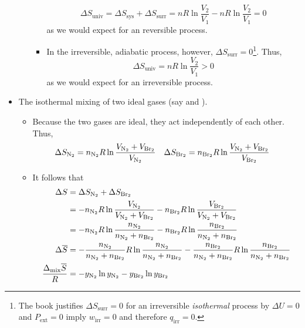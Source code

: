 \documentclass[../notes.tex]{subfiles}
\begin{document}
\begin{itemize}
\begin{itemize}
\begin{itemize}
\begin{equation*}
                \Delta S_\text{univ} = \Delta S_\text{sys}+\Delta S_\text{surr}
                = nR\ln\frac{V_2}{V_1}-nR\ln\frac{V_2}{V_1}
                = 0
            \end{equation*}
            as we would expect for an reversible process.
            \item In the irreversible, adiabatic process, however, $\Delta S_\text{surr}=0$\footnote{The book justifies $\Delta S_\text{surr}=0$ for an irreversible \emph{isothermal} process by $\Delta U=0$ and $P_\text{ext}=0$ imply $w_\text{irr}=0$ and therefore $q_\text{irr}=0$.}. Thus,
            \begin{equation*}
                \Delta S_\text{univ} = nR\ln\frac{V_2}{V_1}
                > 0
            \end{equation*}
            as we would expect for an irreversible process.
        \end{itemize}
    \end{itemize}
    \item The isothermal mixing of two ideal gases (say  and ).
    \begin{itemize}
        \item Because the two gases are ideal, they act independently of each other. Thus,
        \begin{align*}
            \Delta S_{\ce{N2}} &= n_{\ce{N2}}R\ln\frac{V_{\ce{N2}}+V_{\ce{Br2}}}{V_{\ce{N2}}}&
            \Delta S_{\ce{Br2}} &= n_{\ce{Br2}}R\ln\frac{V_{\ce{N2}}+V_{\ce{Br2}}}{V_{\ce{Br2}}}
        \end{align*}
        \item It follows that
        \begin{align*}
            \Delta S &= \Delta S_{\ce{N2}}+\Delta S_{\ce{Br2}}\\
            &= -n_{\ce{N2}}R\ln\frac{V_{\ce{N2}}}{V_{\ce{N2}}+V_{\ce{Br2}}}-n_{\ce{Br2}}R\ln\frac{V_{\ce{Br2}}}{V_{\ce{N2}}+V_{\ce{Br2}}}\\
            &= -n_{\ce{N2}}R\ln\frac{n_{\ce{N2}}}{n_{\ce{N2}}+n_{\ce{Br2}}}-n_{\ce{Br2}}R\ln\frac{n_{\ce{Br2}}}{n_{\ce{N2}}+n_{\ce{Br2}}}\\
            \Delta\overline{S} &= -\frac{n_{\ce{N2}}}{n_{\ce{N2}}+n_{\ce{Br2}}}R\ln\frac{n_{\ce{N2}}}{n_{\ce{N2}}+n_{\ce{Br2}}}-\frac{n_{\ce{Br2}}}{n_{\ce{N2}}+n_{\ce{Br2}}}R\ln\frac{n_{\ce{Br2}}}{n_{\ce{N2}}+n_{\ce{Br2}}}\\
            \frac{\Delta_\text{mix}\overline{S}}{R} &= -y_{\ce{N2}}\ln y_{\ce{N2}}-y_{\ce{Br2}}\ln y_{\ce{Br2}}

\end{align*}
\end{itemize}
\end{itemize}
\end{document}
